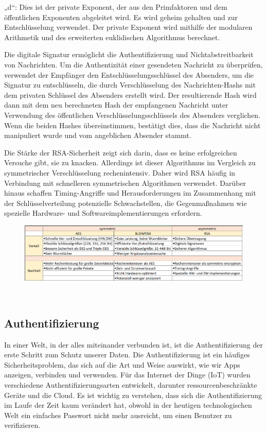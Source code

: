 „d“: Dies ist der private Exponent, der aus den Primfaktoren und dem öffentlichen Exponenten abgeleitet wird. Es wird geheim gehalten und zur Entschlüsselung verwendet. Der private Exponent wird mithilfe der modularen Arithmetik und des erweiterten euklidischen Algorithmus berechnet.

Die digitale Signatur ermöglicht die Authentifizierung und Nichtabstreitbarkeit von Nachrichten. Um die Authentizität einer gesendeten Nachricht zu überprüfen, verwendet der Empfänger den Entschlüsselungsschlüssel des Absenders, um die Signatur zu entschlüsseln, die durch Verschlüsselung des Nachrichten-Hashs mit dem privaten Schlüssel des Absenders erstellt wird. Der resultierende Hash wird dann mit dem neu berechneten Hash der empfangenen Nachricht unter Verwendung des öffentlichen Verschlüsselungsschlüssels des Absenders verglichen. Wenn die beiden Hashes übereinstimmen, bestätigt dies, dass die Nachricht nicht manipuliert wurde und vom angeblichen Absender stammt.

Die Stärke der RSA-Sicherheit zeigt sich darin, dass es keine erfolgreichen Versuche gibt, sie zu knacken. Allerdings ist dieser Algorithmus im Vergleich zu symmetrischer Verschlüsselung rechenintensiv. Daher wird RSA häufig in Verbindung mit schnelleren symmetrischen Algorithmen verwendet. Darüber hinaus schaffen Timing-Angriffe und Herausforderungen im Zusammenhang mit der Schlüsselverteilung potenzielle Schwachstellen, die Gegenmaßnahmen wie spezielle Hardware- und Softwareimplementierungen erfordern. \cite{milanov2009rsa}

\begin{figure}[h]
  \centering
  \includegraphics[scale=0.7]{resources/pic(1).png}
  \caption{}
  \label{fig:vergleich5}
\end{figure}\

\subsection{Authentifizierung}

In einer Welt, in der alles miteinander verbunden ist, ist die Authentifizierung der erste Schritt zum Schutz unserer Daten. Die Authentifizierung ist ein häufiges Sicherheitsproblem, das sich auf die Art und Weise auswirkt, wie wir Apps anzeigen, verbinden und verwenden. Für das Internet der Dinge (IoT) wurden verschiedene Authentifizierungsarten entwickelt, darunter ressourcenbeschränkte Geräte und die Cloud. Es ist wichtig zu verstehen, dass sich die Authentifizierung im Laufe der Zeit kaum verändert hat, obwohl in der heutigen technologischen Welt ein einfaches Passwort nicht mehr ausreicht, um einen Benutzer zu verifizieren.

